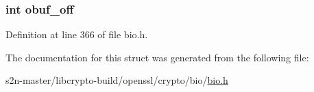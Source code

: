 \subsubsection[{\texorpdfstring{obuf\+\_\+off}{obuf_off}}]{\setlength{\rightskip}{0pt plus 5cm}int obuf\+\_\+off}\hypertarget{structbio__f__buffer__ctx__struct_a53f2d1e0fe42f172c7d9d4d96765b76b}{}\label{structbio__f__buffer__ctx__struct_a53f2d1e0fe42f172c7d9d4d96765b76b}


Definition at line 366 of file bio.\+h.



The documentation for this struct was generated from the following file\+:\begin{DoxyCompactItemize}
\item 
s2n-\/master/libcrypto-\/build/openssl/crypto/bio/\hyperlink{crypto_2bio_2bio_8h}{bio.\+h}\end{DoxyCompactItemize}
